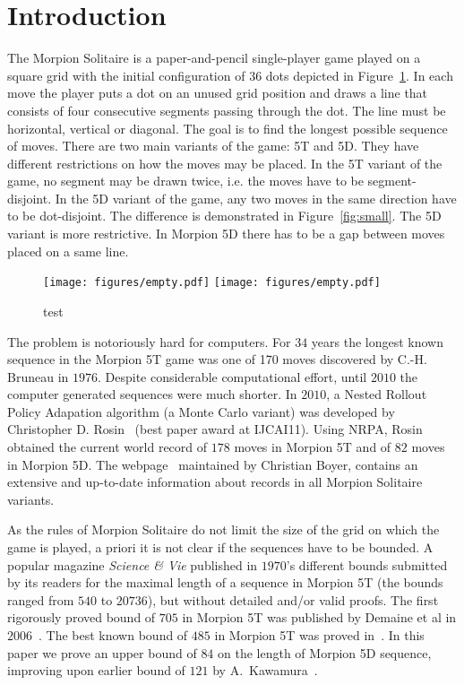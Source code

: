 \section{Introduction}
The Morpion Solitaire is a paper-and-pencil single-player game played on a square grid with 
  the initial configuration of 36 dots depicted in Figure~\ref{fig:initial}. 
In each move the player puts a dot on an unused grid position and draws a line that 
  consists of four consecutive segments passing through the dot. 
The line must be horizontal, vertical or diagonal. 
The goal is to find the longest possible sequence of moves.
There are two main variants of the game: 5T and 5D. 
They have different restrictions on how the moves may be placed.
In the 5T variant of the game, no segment may be drawn twice, i.e. the moves have to be segment-disjoint. 
In the 5D variant of the game, any two moves in the same direction have to be dot-disjoint.
The difference is demonstrated in Figure~\ref{fig:small}.
The 5D variant is more restrictive. In Morpion 5D there has to be a gap between moves
  placed on a same line.


  \begin{figure}
    \centering
      \texttt{[image: figures/empty.pdf]}
      \texttt{[image: figures/empty.pdf]}
      \caption{\label{fig:initial}
	test
      }
\end{figure}

The problem is notoriously hard for computers. 
For $34$ years the longest known sequence in the Morpion 5T game
  was one of 170 moves discovered by C.-H. Bruneau in $1976$. 
Despite considerable computational effort, until $2010$ the computer generated
  sequences were much shorter.
In $2010$, a Nested Rollout Policy Adapation algorithm (a Monte Carlo variant) 
  was developed by Christopher D. Rosin~\cite{rosin} (best paper award at IJCAI11).
Using NRPA, Rosin obtained the current world record of $178$ moves in Morpion 5T 
  and of $82$ moves in Morpion 5D.
The webpage~\cite{} maintained by Christian Boyer, contains an extensive and up-to-date information about records in all Morpion Solitaire variants.

As the rules of Morpion Solitaire do not limit the size of the grid on which the game is played, a priori
  it is not clear if the sequences have to be bounded.
A popular magazine \emph{Science \& Vie} published in $1970$'s different bounds submitted by its readers 
  for the maximal length of a sequence in Morpion 5T
  (the bounds ranged from $540$ to $20736$), but without detailed and/or valid proofs.
The first rigorously proved bound of $705$ in Morpion 5T was published by Demaine et al in $2006$~\cite{demaine}.
The best known bound of $485$ in Morpion 5T was proved in~\cite{}.
In this paper we prove an upper bound of $84$ on the length of Morpion 5D sequence, improving upon earlier bound of $121$ by A.~Kawamura~\cite{japonczycy}.

